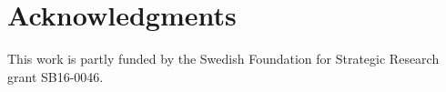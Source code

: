 \documentclass{article}
\begin{document}


\section{Acknowledgments}
\label{sec:acklg}
This work is partly funded by the Swedish Foundation for Strategic Research grant SB16-0046. 



\end{document}
